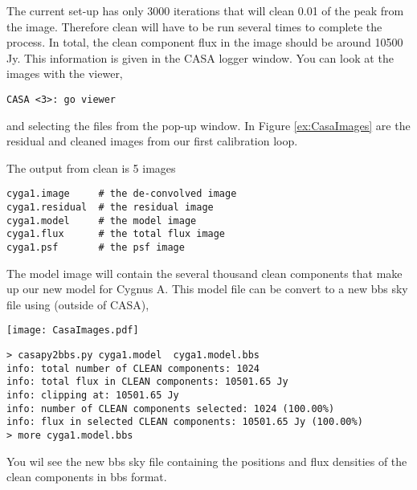 The current set-up has only 3000 iterations that will clean 0.01 of the peak from the image. Therefore clean will have to be run several times to complete the process. In total, the clean component flux in the image should be around 10500 Jy. This information is given in the CASA logger window. You can look at the images with the viewer,

\begin{verbatim}
CASA <3>: go viewer
\end{verbatim}

and selecting the files from the pop-up window. In Figure \ref{ex:CasaImages} are the residual and cleaned images from our first calibration loop.

The output from clean is 5 images
\begin{verbatim}
cyga1.image     # the de-convolved image
cyga1.residual  # the residual image
cyga1.model     # the model image
cyga1.flux      # the total flux image
cyga1.psf       # the psf image
\end{verbatim}

The model image will contain the several thousand clean components that make up our new model for Cygnus A. This model file can be convert to a new bbs sky file using (outside of CASA),


\begin{figure*}[!h]
\begin{center}
    \texttt{[image: CasaImages.pdf]}
  \caption{The clean image (left), the residual (middle) and the model (right) image for Cygnus A.}
  \label{ex:CasaImages}
  \end{center}
\end{figure*}

\begin{verbatim}
> casapy2bbs.py cyga1.model  cyga1.model.bbs
info: total number of CLEAN components: 1024
info: total flux in CLEAN components: 10501.65 Jy
info: clipping at: 10501.65 Jy
info: number of CLEAN components selected: 1024 (100.00%)
info: flux in selected CLEAN components: 10501.65 Jy (100.00%)
> more cyga1.model.bbs
\end{verbatim}

You wil see the new bbs sky file containing the positions and flux densities of the clean components in bbs format.



